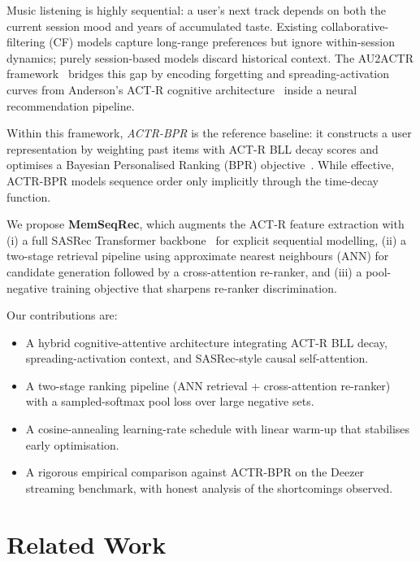 \documentclass[conference]{IEEEtran}
\begin{document}
Music listening is highly sequential: a user's next track depends
on both the current session mood and years of accumulated taste.
Existing collaborative-filtering (CF) models capture long-range
preferences but ignore within-session dynamics; purely
session-based models discard historical context.
The AU2ACTR framework~\cite{au2actr} bridges this gap by encoding
forgetting and spreading-activation curves from Anderson's ACT-R
cognitive architecture~\cite{anderson1983} inside a neural
recommendation pipeline.

Within this framework, \textit{ACTR-BPR} is the reference baseline:
it constructs a user representation by weighting past items with
ACT-R BLL decay scores and optimises a Bayesian Personalised
Ranking (BPR) objective~\cite{rendle2009bpr}.
While effective, ACTR-BPR models sequence order only implicitly
through the time-decay function.

We propose \textbf{MemSeqRec}, which augments the ACT-R feature
extraction with (i) a full SASRec Transformer
backbone~\cite{kang2018sasrec} for explicit sequential modelling,
(ii) a two-stage retrieval pipeline using approximate nearest
neighbours (ANN) for candidate generation followed by a
cross-attention re-ranker, and (iii) a pool-negative training
objective that sharpens re-ranker discrimination.

Our contributions are:
\begin{itemize}
    \item A hybrid cognitive-attentive architecture integrating
          ACT-R BLL decay, spreading-activation context, and
          SASRec-style causal self-attention.
    \item A two-stage ranking pipeline (ANN retrieval +
          cross-attention re-ranker) with a sampled-softmax pool
          loss over large negative sets.
    \item A cosine-annealing learning-rate schedule with linear
          warm-up that stabilises early optimisation.
    \item A rigorous empirical comparison against ACTR-BPR on
          the Deezer streaming benchmark, with honest analysis
          of the shortcomings observed.
\end{itemize}

\section{Related Work}
\end{document}
